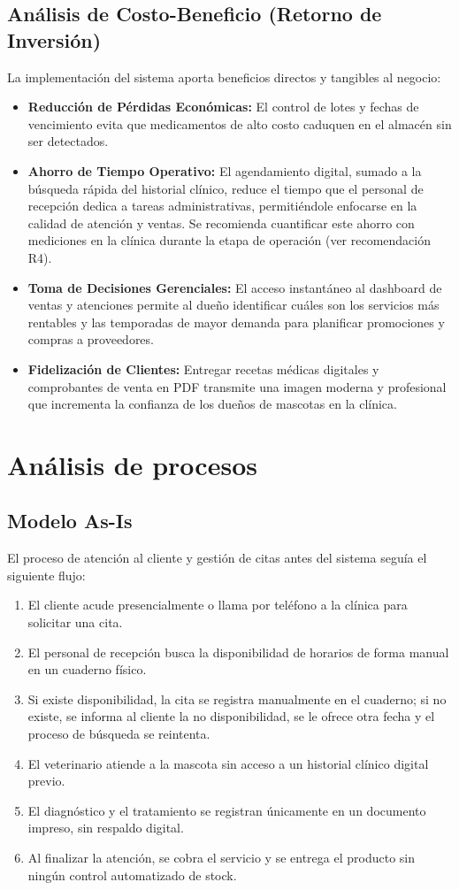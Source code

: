 \documentclass[11pt,a4paper]{report}
\begin{document}
\subsection{Análisis de Costo-Beneficio (Retorno de Inversión)}
La implementación del sistema aporta beneficios directos y tangibles al negocio:
\begin{itemize}
\item \textbf{Reducción de Pérdidas Económicas:} El control de lotes y fechas de vencimiento evita que medicamentos de alto costo caduquen en el almacén sin ser detectados.
\item \textbf{Ahorro de Tiempo Operativo:} El agendamiento digital, sumado a la búsqueda rápida del historial clínico, reduce el tiempo que el personal de recepción dedica a tareas administrativas, permitiéndole enfocarse en la calidad de atención y ventas. Se recomienda cuantificar este ahorro con mediciones en la clínica durante la etapa de operación (ver recomendación R4).
\item \textbf{Toma de Decisiones Gerenciales:} El acceso instantáneo al dashboard de ventas y atenciones permite al dueño identificar cuáles son los servicios más rentables y las temporadas de mayor demanda para planificar promociones y compras a proveedores.
\item \textbf{Fidelización de Clientes:} Entregar recetas médicas digitales y comprobantes de venta en PDF transmite una imagen moderna y profesional que incrementa la confianza de los dueños de mascotas en la clínica.
\end{itemize}

\section{Análisis de procesos}
\subsection{Modelo As-Is}
El proceso de atención al cliente y gestión de citas antes del sistema seguía el siguiente flujo:
\begin{enumerate}[label=\arabic*.]
    \item El cliente acude presencialmente o llama por teléfono a la clínica para solicitar una cita.
    \item El personal de recepción busca la disponibilidad de horarios de forma manual en un cuaderno físico.
    \item Si existe disponibilidad, la cita se registra manualmente en el cuaderno; si no existe, se informa al cliente la no disponibilidad, se le ofrece otra fecha y el proceso de búsqueda se reintenta.
    \item El veterinario atiende a la mascota sin acceso a un historial clínico digital previo.
    \item El diagnóstico y el tratamiento se registran únicamente en un documento impreso, sin respaldo digital.
    \item Al finalizar la atención, se cobra el servicio y se entrega el producto sin ningún control automatizado de stock.
\end{enumerate}
\end{document}
